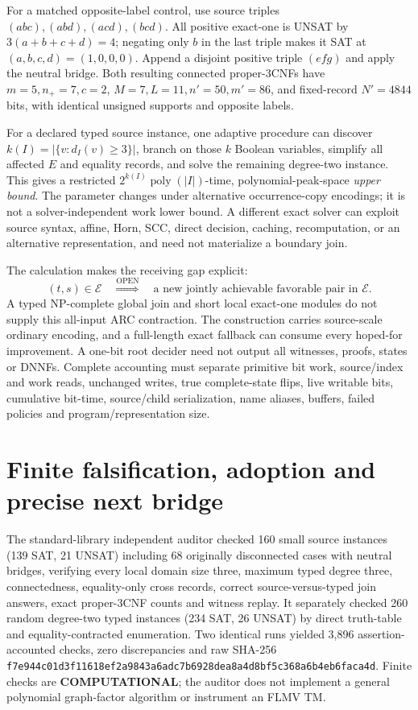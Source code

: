 \documentclass[11pt]{article}
\begin{document}
For a matched opposite-label control, use source triples
$(abc),(abd),(acd),(bcd)$. All positive exact-one is UNSAT by
$3(a+b+c+d)=4$; negating only $b$ in the last triple makes it SAT at
$(a,b,c,d)=(1,0,0,0)$. Append a disjoint positive triple $(efg)$ and
apply the neutral bridge. Both resulting connected proper-3CNFs have
$m=5,n_+=7,c=2$, $M=7,L=11,n'=50,m'=86$, and fixed-record
$N'=4844$ bits, with identical unsigned supports and opposite labels.

For a declared typed source instance, one adaptive procedure can
discover $k(I)=|\{v:d_I(v)\ge3\}|$, branch on those $k$ Boolean variables,
simplify all affected $E$ and equality records, and solve the remaining
degree-two instance. This gives a restricted
$2^{k(I)}\operatorname{poly}(|I|)$-time, polynomial-peak-space
\emph{upper bound}. The parameter changes under alternative
occurrence-copy encodings; it is not a solver-independent work lower
bound. A different exact solver can exploit source syntax, affine,
Horn, SCC, direct decision, caching, recomputation, or an alternative
representation, and need not materialize a boundary join.

The calculation makes the receiving gap explicit:
\[
 (t,s)\in\mathcal E\quad
 \overset{\mathrm{OPEN}}{\Longrightarrow}\quad
 \text{a new jointly achievable favorable pair in }\mathcal E .
\]
A typed NP-complete global join and short local exact-one modules do
not supply this all-input ARC contraction. The construction carries
source-scale ordinary encoding, and a full-length exact fallback can
consume every hoped-for improvement. A one-bit root decider need not
output all witnesses, proofs, states or DNNFs. Complete accounting
must separate primitive bit work, source/index and work reads, unchanged
writes, true complete-state flips, live writable bits, cumulative
bit-time, source/child serialization, name aliases, buffers, failed
policies and program/representation size.

\section{Finite falsification, adoption and precise next bridge}
The standard-library independent auditor checked 160 small source
instances (139 SAT, 21 UNSAT) including 68 originally disconnected
cases with neutral bridges, verifying every local domain size three,
maximum typed degree three, connectedness, equality-only cross records,
correct source-versus-typed join answers, exact proper-3CNF counts and
witness replay. It separately checked 260 random degree-two typed
instances (234 SAT, 26 UNSAT) by direct truth-table and
equality-contracted enumeration. Two identical runs yielded 3,896
assertion-accounted checks, zero discrepancies and raw SHA-256
\texttt{f7e944c01d3f11618ef2a9843a6adc7b6928dea8a4d8bf5c368a6b4eb6faca4d}.
Finite checks are \textbf{COMPUTATIONAL}; the auditor does not implement
a general polynomial graph-factor algorithm or instrument an FLMV TM.
\end{document}
